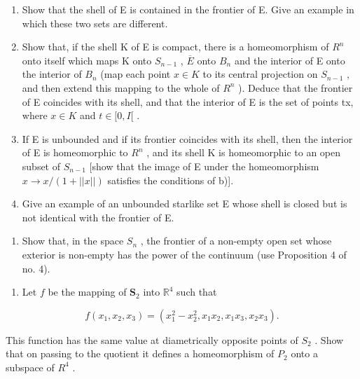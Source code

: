 \begin{enumerate}
\def\labelenumi{\alph{enumi})}
\item
  Show that the shell of E is contained in the frontier of E. Give an example in which these two sets are different.
\item
  Show that, if the shell K of E is compact, there is a homeomorphism of \(R^{n}\) onto itself which maps K onto \(S_{n-1}\) , \(\overline{E}\) onto \(B_{n}\) and the interior of E onto the interior of \(B_{n}\) (map each point \(x \in K\) to its central projection on \(S_{n-1}\) , and then extend this mapping to the whole of \(R^{n}\) ). Deduce that the frontier of E coincides with its shell, and that the interior of E is the set of points tx, where \(x \in K\) and \(t \in [0, I[\) .
\item
  If E is unbounded and if its frontier coincides with its shell, then the interior of E is homeomorphic to \(R^{n}\) , and its shell K is homeomorphic to an open subset of \(S_{n-1}\) {[}show that the image of E under the homeomorphism \(x \to x/(1 + ||x||)\) satisfies the conditions of b){]}.
\item
  Give an example of an unbounded starlike set E whose shell is closed but is not identical with the frontier of E.
\end{enumerate}

\begin{enumerate}
\def\labelenumi{\arabic{enumi})}
\setcounter{enumi}{12}
\tightlist
\item
  Show that, in the space \(S_{n}\) , the frontier of a non-empty open set whose exterior is non-empty has the power of the continuum (use Proposition 4 of no. 4).
\end{enumerate}

\ExerciseSection

\begin{enumerate}
\def\labelenumi{\arabic{enumi})}
\tightlist
\item
  Let \(f\) be the mapping of \(\mathbf{S}_2\) into \(\mathbb{R}^4\) such that
\end{enumerate}

\[
f \left(x _ {1}, x _ {2}, x _ {3}\right) = \left(x _ {1} ^ {2} - x _ {2} ^ {2}, x _ {1} x _ {2}, x _ {1} x _ {3}, x _ {2} x _ {3}\right).
\]

This function has the same value at diametrically opposite points of \(S_{2}\) . Show that on passing to the quotient it defines a homeomorphism of \(P_{2}\) onto a subspace of \(R^{4}\) .

